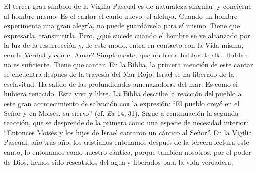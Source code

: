 			\begin{body}El tercer gran símbolo de la Vigilia Pascual es de naturaleza singular, y concierne al hombre mismo. Es el cantar el canto nuevo, el aleluya. Cuando un hombre experimenta una gran alegría, no puede guardársela para sí mismo. Tiene que expresarla, transmitirla. Pero, ¿qué sucede cuando el hombre se ve alcanzado por la luz de la resurrección y, de este modo, entra en contacto con la Vida misma, con la Verdad y con el Amor? Simplemente, que no basta hablar de ello. Hablar no es suficiente. Tiene que cantar. En la Biblia, la primera mención de este cantar se encuentra después de la travesía del Mar Rojo. Israel se ha liberado de la esclavitud. Ha salido de las profundidades amenazadoras del mar. Es como si hubiera renacido. Está vivo y libre. La Biblia describe la reacción del pueblo a este gran acontecimiento de salvación con la expresión: “El pueblo creyó en el Señor y en Moisés, su siervo” (cf. \textit{Ex }14, 31). Sigue a continuación la segunda reacción, que se desprende de la primera como una especie de necesidad interior: “Entonces Moisés y los hijos de Israel cantaron un cántico al Señor”. En la Vigilia Pascual, año tras año, los cristianos entonamos después de la tercera lectura este canto, lo entonamos como nuestro cántico, porque también nosotros, por el poder de Dios, hemos sido rescatados del agua y liberados para la vida verdadera.\end{body}
			
